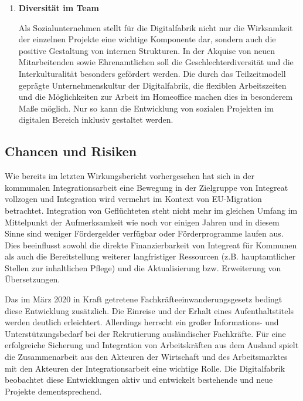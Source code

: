 \documentclass[12pt, a4paper]{article} %
\begin{document}
\begin{enumerate}
\item \textbf{Diversität im Team}

Als Sozialunternehmen stellt für die Digitalfabrik nicht nur die
Wirksamkeit der einzelnen Projekte eine wichtige Komponente dar, sondern
auch die positive Gestaltung von internen Strukturen. In der Akquise von
neuen Mitarbeitenden sowie Ehrenamtlichen soll die
Geschlechterdiversität und die Interkulturalität besonders gefördert
werden. Die durch das Teilzeitmodell geprägte Unternehmenskultur der
Digitalfabrik, die flexiblen Arbeitszeiten und die Möglichkeiten zur
Arbeit im Homeoffice machen dies in besonderem Maße möglich. Nur so kann
die Entwicklung von sozialen Projekten im digitalen Bereich inklusiv
gestaltet werden.

\end{enumerate}

\hypertarget{chancen-und-risiken}{%
\subsection{Chancen und Risiken}\label{chancen-und-risiken}}

Wie bereits im letzten Wirkungsbericht vorhergesehen hat sich in der
kommunalen Integrationsarbeit eine Bewegung in der Zielgruppe von
Integreat vollzogen und Integration wird vermehrt im Kontext von
EU-Migration betrachtet. Integration von Geflüchteten steht nicht mehr
im gleichen Umfang im Mittelpunkt der Aufmerksamkeit wie noch vor
einigen Jahren und in diesem Sinne sind weniger Fördergelder verfügbar
oder Förderprogramme laufen aus. Dies beeinflusst sowohl die direkte
Finanzierbarkeit von Integreat für Kommunen als auch die Bereitstellung
weiterer langfristiger Ressourcen (z.B. hauptamtlicher Stellen zur
inhaltlichen Pflege) und die Aktualisierung bzw. Erweiterung von
Übersetzungen.

Das im März 2020 in Kraft getretene Fachkräfteeinwanderungsgesetz
bedingt diese Entwicklung zusätzlich. Die Einreise und der Erhalt eines
Aufenthaltstitels werden deutlich erleichtert. Allerdings herrscht ein
großer Informations- und Unterstützungsbedarf bei der Rekrutierung
ausländischer Fachkräfte. Für eine erfolgreiche Sicherung und
Integration von Arbeitskräften aus dem Ausland spielt die Zusammenarbeit
aus den Akteuren der Wirtschaft und des Arbeitsmarktes mit den Akteuren
der Integrationsarbeit eine wichtige Rolle. Die Digitalfabrik beobachtet
diese Entwicklungen aktiv und entwickelt bestehende und neue Projekte
dementsprechend.
\end{document}
